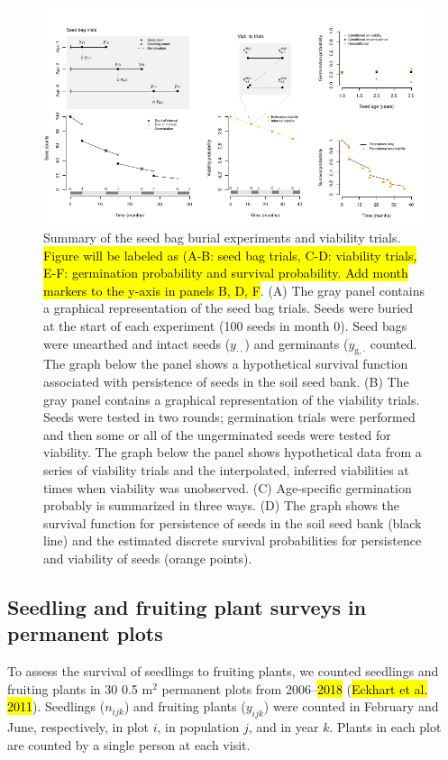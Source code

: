 \documentclass[12pt, oneside, titlepage]{article}   	%
\begin{document}
\begin{figure}[!h]
       \includegraphics[width=\textwidth]{../../manuscript/figures/seed-bag-figure.pdf}  
    \caption{ Summary of the seed bag burial experiments and viability trials. \hl{Figure will be labeled as (A-B: seed bag trials, C-D: viability trials, E-F: germination probability and survival probability. Add month markers to the y-axis in panels B, D, F}. (A) The gray panel contains a graphical representation of the seed bag trials. Seeds were buried at the start of each experiment (100 seeds in month 0). Seed bags were unearthed and intact seeds ($y_{\cdot \cdot}$) and germinants ($y_{\mathrm{g},\cdot}$ counted. The graph below the panel shows a hypothetical survival function associated with persistence of seeds in the soil seed bank. (B) The gray panel contains a graphical representation of the viability trials. Seeds were tested in two rounds; germination trials were performed and then some or all of the ungerminated seeds were tested for viability. The graph below the panel shows hypothetical data from a series of viability trials and the interpolated, inferred viabilities at times when viability was unobserved. (C) Age-specific germination probably is summarized in three ways. (D) The graph shows the survival function for persistence of seeds in the soil seed bank (black line) and the estimated discrete survival probabilities for persistence and viability of seeds (orange points). }
 \label{fig:seed-bag-experiments}
\end{figure}

\subsection{Seedling and fruiting plant surveys in permanent plots}

To assess the survival of seedlings to fruiting plants, we counted seedlings and fruiting plants in 30 0.5 m$^2$ permanent plots from 2006--\hl{2018} (\hl{Eckhart et al. 2011}). Seedlings ($n_{ijk}$) and fruiting plants ($y_{ijk}$) were counted in February and June, respectively, in plot $i$, in population $j$, and in year $k$. Plants in each plot are counted by a single person at each visit. 
\end{document}
